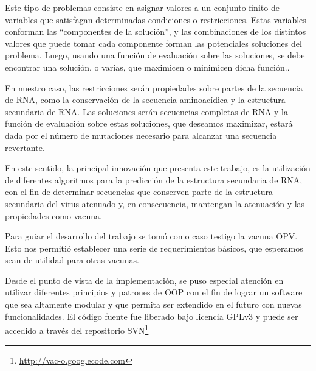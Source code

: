 Este tipo de problemas consiste en asignar valores a un conjunto finito de
variables que satisfagan determinadas condiciones o restricciones. Estas
variables conforman las ``componentes de la soluci\'on'', y las combinaciones de
los distintos valores que puede tomar cada componente forman las potenciales
soluciones del problema. Luego, usando una funci\'on de evaluaci\'on sobre las
soluciones, se debe encontrar una soluci\'on, o varias, que maximicen o
minimicen dicha funci\'on.\cite{Hoos04}.

En nuestro caso, las restricciones ser\'an propiedades sobre partes de la
secuencia de \ac{RNA}, como la conservaci\'on de la secuencia aminoac\'idica y
la estructura secundaria de \ac{RNA}. Las soluciones ser\'an secuencias
completas de \ac{RNA} y la funci\'on de evaluaci\'on sobre estas soluciones, que
deseamos maximizar, estar\'a dada por el n\'umero de mutaciones necesario para
alcanzar una secuencia revertante.

En este sentido, la principal innovaci\'on que presenta este trabajo, es la
utilizaci\'on de diferentes algoritmos para la predicci\'on de la estructura
secundaria de \ac{RNA}, con el fin de determinar secuencias que conserven parte
de la estructura secundaria del virus atenuado y, en consecuencia, mantengan la
atenuaci\'on y las propiedades como vacuna.

Para guiar el desarrollo del trabajo se tom\'o como caso testigo la vacuna
\ac{OPV}. Esto nos permiti\'o establecer una serie de requerimientos b\'asicos,
que esperamos sean de utilidad para otras vacunas.

Desde el punto de vista de la implementaci\'on, se puso especial atenci\'on en
utilizar diferentes principios y patrones de \ac{OOP} con
el fin de lograr un software que sea altamente modular y que permita ser
extendido en el futuro con nuevas funcionalidades. El c\'odigo fuente fue
liberado bajo licencia \ac{GPLv3} y puede ser accedido a trav\'es del
repositorio \ac{SVN}\footnote{\url{http://vac-o.googlecode.com}}